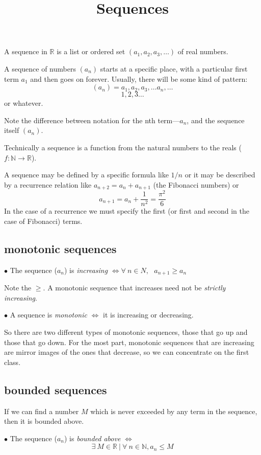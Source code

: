 \documentclass[11pt, oneside]{article}
\title{Sequences}
\date{}
\begin{document}
\maketitle
\Large

A sequence in $\mathbb{R}$ is a list or ordered set $(a_1, a_2, a_3, \dots)$ of real numbers.

A sequence of numbers $(a_n)$ starts at a specific place, with a particular first term $a_1$ and then goes on forever.  Usually, there will be some kind of pattern:
\[ (a_n) = a_1,  a_2, a_3, \dots a_n, \dots \]
\[ 1,2,3 \dots \]
or whatever.  

Note the difference between notation for the nth term---$a_n$, and the sequence itself $(a_n)$.

Technically a sequence is a function from the natural numbers to the reals ($f : \mathbb{N} \rightarrow \mathbb{R}$).

A sequence may be defined by a specific formula like $1/n$ or it may be described by a recurrence relation like $a_{n+2} = a_n + a_{n+1}$ (the Fibonacci numbers) or
\[ a_{n+1} = a_n + \frac{1}{n^2} = \frac{\pi^2}{6} \]
In the case of a recurrence we must specify the first (or first and second in the case of Fibonacci) terms.

\subsection*{monotonic sequences}
$\bullet$  The sequence ($a_n$) is \emph{increasing} $\iff \forall \ n \in N, \ \ \ a_{n+1} \ge a_n$

Note the $\ge$.  A monotonic sequence that increases need not be \emph{strictly increasing}.  

$\bullet$  A sequence is \emph{monotonic} $\iff$ it is increasing or decreasing.

So there are two different types of monotonic sequences, those that go up and those that go down.  For the most part, monotonic sequences that are increasing are mirror images of the ones that decrease, so we can concentrate on the first class.

\subsection*{bounded sequences}

If we can find a number $M$ which is never exceeded by any term in the sequence, then it is bounded above.  

$\bullet$  The sequence ($a_n$) is \emph{bounded above} $\iff$
\[ \exists \ M \in \mathbb{R} \ | \ \forall \ n \in \mathbb{N}, a_n \le M \]
\end{document}
